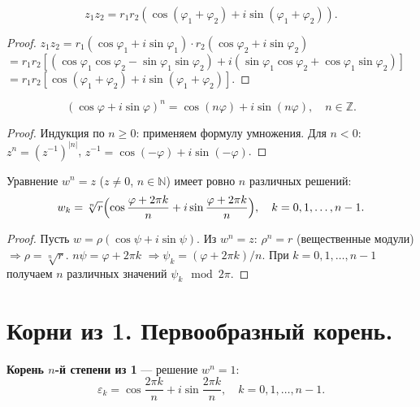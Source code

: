 \documentclass[12pt]{article}
\begin{document}
\begin{theorem}
\[
z_1 z_2 = r_1 r_2 (\cos(\varphi_1 + \varphi_2) + i\sin(\varphi_1+\varphi_2)).
\]
\end{theorem}

\begin{proof}
$z_1 z_2 = r_1(\cos\varphi_1 + i\sin\varphi_1) \cdot r_2(\cos\varphi_2 + i\sin\varphi_2)$
$= r_1 r_2[(\cos\varphi_1\cos\varphi_2 - \sin\varphi_1\sin\varphi_2)
+ i(\sin\varphi_1\cos\varphi_2 + \cos\varphi_1\sin\varphi_2)]$
$= r_1 r_2[\cos(\varphi_1+\varphi_2) + i\sin(\varphi_1+\varphi_2)]$.
\end{proof}

\begin{theorem}
\[
(\cos\varphi + i\sin\varphi)^n = \cos(n\varphi) + i\sin(n\varphi),
\quad n \in \mathbb{Z}.
\]
\end{theorem}

\begin{proof}
Индукция по $n \geq 0$: применяем формулу умножения.
Для $n < 0$: $z^n = (z^{-1})^{|n|}$, $z^{-1} = \cos(-\varphi)+i\sin(-\varphi)$.
\end{proof}

\begin{theorem}
Уравнение $w^n = z$ ($z \neq 0$, $n \in \mathbb{N}$) имеет ровно $n$
различных решений:
\[
w_k = \sqrt[n]{r}\Bigl(\cos\frac{\varphi + 2\pi k}{n} + i\sin\frac{\varphi+2\pi k}{n}\Bigr),
\quad k = 0, 1, \ldots, n-1.
\]
\end{theorem}

\begin{proof}
Пусть $w = \rho(\cos\psi + i\sin\psi)$. Из $w^n = z$:
$\rho^n = r$ (вещественные модули) $\Rightarrow \rho = \sqrt[n]{r}$.
$n\psi = \varphi + 2\pi k$ $\Rightarrow \psi_k = (\varphi + 2\pi k)/n$.
При $k = 0, 1, \ldots, n-1$ получаем $n$ различных значений $\psi_k \mod 2\pi$.
\end{proof}

\section{Корни из 1. Первообразный корень.}

\begin{definition}
\textbf{Корень $n$-й степени из 1} --- решение $w^n = 1$:
\[
\varepsilon_k = \cos\frac{2\pi k}{n} + i\sin\frac{2\pi k}{n},
\quad k = 0,1,\ldots,n-1.
\]
\end{definition}
\end{document}
